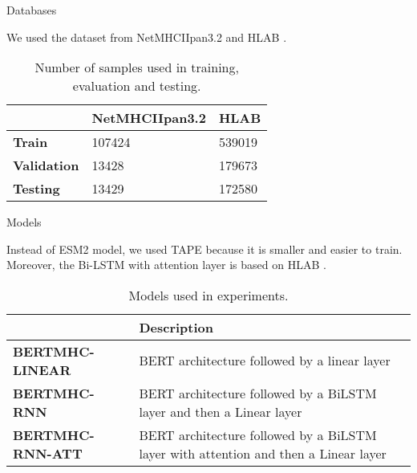 \documentclass[10pt]{beamer}
\newcommand{\1}{
	\setbeamertemplate{background}{
		\texttt{[image: img/1]}
		\tikz[overlay] \fill[fill opacity=0.75,fill=white] (0,0) rectangle (-\paperwidth,\paperheight);
	}
}
\begin{document}
\begin{frame}{Databases}{}
	
	We used the dataset from NetMHCIIpan3.2 \cite{jensen2018improved} and HLAB  \cite{zhang2022hlab}.
	
	\begin{table}[h]
		\centering
		\caption{Number of samples used in training, evaluation and testing.}
		\setlength{\tabcolsep}{0.8em} %
		{\renewcommand{\arraystretch}{1.3}%

		 	\begin{tabular}{lll}
		 		& \textbf{NetMHCIIpan3.2} & \textbf{HLAB} \\ \hline
		 		\textbf{Train}      & 107424  &   539019   \\
		 		\textbf{Validation} & 13428  &   179673   \\
		 		\textbf{Testing}    & 13429  &  172580   
		 	\end{tabular}

		}
	\end{table}

\end{frame}

\begin{frame}{Models}{}
	
	Instead of ESM2 \cite{lin2023evolutionary} model, we used TAPE \cite{rao2019evaluating} because it is smaller and easier to train. Moreover, the Bi-LSTM with attention layer is based on HLAB \cite{zhang2022hlab}.
	
	\begin{table}[h]
		\centering
		\caption{Models used in experiments.}
		\setlength{\tabcolsep}{0.8em} %
		{\renewcommand{\arraystretch}{1.3}%
			
			\begin{tabular}{lp{6cm}}
				& \textbf{Description}\\ \hline
				\textbf{BERTMHC-LINEAR}      & BERT architecture followed by a linear layer        \\
				\textbf{BERTMHC-RNN} & BERT architecture followed by a BiLSTM layer and then a Linear layer        \\
				\textbf{BERTMHC-RNN-ATT}    & BERT architecture followed by a BiLSTM layer with attention and then a Linear layer       
			\end{tabular}
			
		}
	\end{table}
	
\end{frame}
\end{document}
